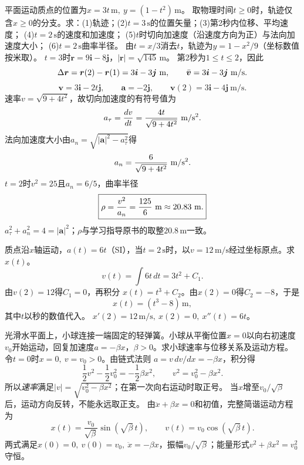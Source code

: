 

\problemtext 平面运动质点的位置为$x=3t\,\mathrm m,\ y=(1-t^2)\,\mathrm m$。
取物理时间$t\ge0$时，轨迹仅含$x\ge0$的分支。求：(1)轨迹；(2)$t=3\,\mathrm s$的位置矢量；(3)第2秒内位移、平均速度；
(4)$t=2\,\mathrm s$的速度和加速度；
(5)$t$时切向加速度（沿速度方向为正）与法向加速度大小；
(6)$t=2\,\mathrm s$曲率半径。
\workings
由$t=x/3$消去$t$，轨迹为$y=1-x^2/9$（坐标数值按米取）。
$t=3$时$\bm r=9\bm i-8\bm j$，$|\bm r|=\sqrt{145}\,\mathrm m$。
第2秒为$1\le t\le2$，因此
\[
\Delta\bm r=\bm r(2)-\bm r(1)=3\bm i-3\bm j\ {\rm m},
\qquad \bar{\bm v}=3\bm i-3\bm j\ {\rm m/s}.
\]
\[
\bm v=3\bm i-2t\bm j,\qquad
\bm a=-2\bm j,\qquad
\bm v(2)=3\bm i-4\bm j\ \mathrm{m/s}.
\]
速率$v=\sqrt{9+4t^2}$，故切向加速度的有符号值为
\[
a_\tau=\frac{dv}{dt}=\frac{4t}{\sqrt{9+4t^2}}\ {\rm m/s^2}.
\]
法向加速度大小由$a_n=\sqrt{|\bm a|^2-a_\tau^2}$得
\[
a_n=\frac{6}{\sqrt{9+4t^2}}\ {\rm m/s^2}.
\]
$t=2$时$v^2=25$且$a_n=6/5$，曲率半径
\[
\boxed{\rho=\frac{v^2}{a_n}=\frac{125}{6}\ {\rm m}\approx20.83\ {\rm m}.}
\]
\crosscheck $a_\tau^2+a_n^2=4=|\bm a|^2$；$\rho$与学习指导原书的取整$20.8\,\mathrm m$一致。

\problemtext 质点沿$x$轴运动，$a(t)=6t$（SI），当$t=2\,\mathrm s$时，以$v=12\,\mathrm{m/s}$经过坐标原点。求$x(t)$。
\workings
\[
v(t)=\int6t\,dt=3t^2+C_1.
\]
由$v(2)=12$得$C_1=0$，再积分
$x(t)=t^3+C_2$。由$x(2)=0$得$C_2=-8$，于是
\[
\boxed{x(t)=(t^3-8)\,\mathrm m,}
\]
其中$t$以秒的数值代入。
\crosscheck $x'(2)=12\,\mathrm{m/s},\ x(2)=0,\ x''(t)=6t$。

\problemtext 光滑水平面上，小球连接一端固定的轻弹簧。小球从平衡位置$x=0$以向右初速度$v_0$开始运动，回复加速度$a=-\beta x$，$\beta>0$。求小球速率与位移关系及运动方程。
\workings
令$t=0$时$x=0,\ v=v_0>0$。由链式法则
$a=v\,dv/dx=-\beta x$，积分得
\[
\frac12v^2-\frac12v_0^2=-\frac12\beta x^2,
\qquad
v^2=v_0^2-\beta x^2.
\]
所以\emph{速率}满足$|v|=\sqrt{v_0^2-\beta x^2}$；在第一次向右运动时取正号。
当$x$增至$v_0/\sqrt\beta$后，运动方向反转，不能永远取正支。
由$\ddot x+\beta x=0$和初值，完整简谐运动方程为
\[
\boxed{x(t)=\frac{v_0}{\sqrt\beta}\sin(\sqrt\beta\,t),\qquad
v(t)=v_0\cos(\sqrt\beta\,t).}
\]
\crosscheck 两式满足$x(0)=0,\ v(0)=v_0,\ \ddot x=-\beta x$，振幅$v_0/\sqrt\beta$；能量形式$v^2+\beta x^2=v_0^2$守恒。

